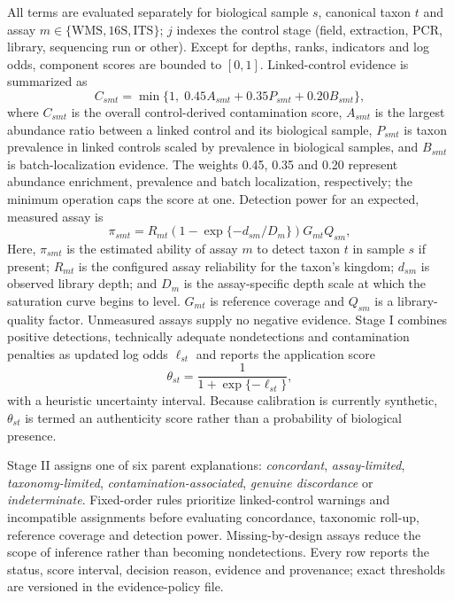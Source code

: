 \documentclass[9pt,twocolumn]{extarticle}
\begin{document}
All terms are evaluated separately for biological sample $s$, canonical taxon
$t$ and assay $m\in\{\mathrm{WMS},\mathrm{16S},\mathrm{ITS}\}$; $j$ indexes
the control stage (field, extraction, PCR, library, sequencing run or other).
Except for depths, ranks, indicators and log odds, component scores are bounded
to $[0,1]$. Linked-control evidence is summarized as
\begin{equation}
 C_{smt}=\min\{1,\;0.45A_{smt}+0.35P_{smt}+0.20B_{smt}\},
 \label{eq:contamination}
\end{equation}
where $C_{smt}$ is the overall control-derived contamination score,
$A_{smt}$ is the largest abundance ratio between a linked control and its
biological sample, $P_{smt}$ is taxon prevalence in linked controls scaled by
prevalence in biological samples, and $B_{smt}$ is batch-localization evidence.
The weights 0.45, 0.35 and 0.20 represent abundance enrichment, prevalence and
batch localization, respectively; the minimum operation caps the score at one.
Detection power for an expected, measured assay is
\begin{equation}
 \pi_{smt}=R_{mt}\left(1-\exp\{-d_{sm}/D_m\}\right)G_{mt}Q_{sm},
 \label{eq:detection-power}
\end{equation}
Here, $\pi_{smt}$ is the estimated ability of assay $m$ to detect taxon $t$ in
sample $s$ if present; $R_{mt}$ is the configured assay reliability for the
taxon's kingdom; $d_{sm}$ is observed library depth; and $D_m$ is the
assay-specific depth scale at which the saturation curve begins to level.
$G_{mt}$ is reference coverage and $Q_{sm}$ is a library-quality factor.
Unmeasured assays supply no negative evidence. Stage I combines positive
detections, technically adequate nondetections and contamination penalties as
updated log odds $\ell_{st}$ and reports the application score
\begin{equation}
 \theta_{st}=\frac{1}{1+\exp\{-\ell_{st}\}},
 \label{eq:authenticity}
\end{equation}
with a heuristic uncertainty interval. Because calibration is currently
synthetic, $\theta_{st}$ is termed an authenticity score rather than a
probability of biological presence.

Stage II assigns one of six parent explanations: \emph{concordant},
\emph{assay-limited}, \emph{taxonomy-limited},
\emph{contamination-associated}, \emph{genuine discordance} or
\emph{indeterminate}. Fixed-order rules prioritize linked-control warnings and
incompatible assignments before evaluating concordance, taxonomic roll-up,
reference coverage and detection power. Missing-by-design assays reduce the
scope of inference rather than becoming nondetections. Every row reports the
status, score interval, decision reason, evidence and provenance; exact
thresholds are versioned in the evidence-policy file.
\end{document}
